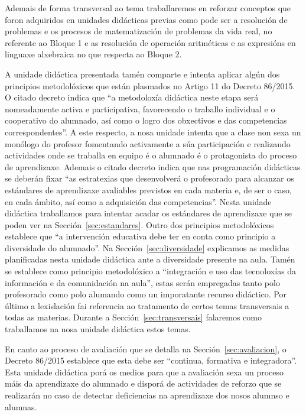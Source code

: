 Ademais de forma transversal ao tema traballaremos en reforzar conceptos que foron adquiridos en unidades didácticas previas como pode ser a resolución de problemas e os procesos de matematización de problemas da vida real, no referente ao Bloque 1 e as resolución de operación aritméticas e  as expresións en linguaxe alxebraica no que respecta ao Bloque 2.

A unidade didáctica presentada tamén comparte e intenta aplicar algún dos principios metodolóxicos que están plasmados no Artigo 11 do Decreto 86/2015. O citado decreto indica que ``a metodoloxía didáctica neste etapa será nomeadamente activa e participativa, favorecendo o traballo individual e o cooperativo do alumnado, así como o logro dos obxectivos e das competencias correspondentes''. A este respecto, a nosa unidade intenta que a clase non sexa un monólogo do profesor fomentando activamente a súa participación e realizando actividades onde se traballa en equipo é o alumnado é o protagonista do proceso de aprendizaxe. Ademais o citado decreto indica que nas programación didácticas se deberán fixar ``as estratexias que desenvolverá o profesorado para alcanzar os estándares de aprendizaxe avaliables previstos en cada materia e, de ser o caso, en cada ámbito, así como a adquisición das competencias''. Nesta unidade didáctica traballamos para intentar acadar os estándares de aprendizaxe que se poden ver na Sección~\ref{sec:estandares}. Outro dos principios metodolóxicos establece que ``a intervención educativa debe ter en conta como principio a diversidade do alumnado''. Na Sección~\ref{sec:diversidade} explicamos as medidas planificadas nesta unidade didáctica ante a diversidade presente na aula. Tamén se establece como principio metodolóxico a ``integración e uso das tecnoloxías da información e da comunidación na aula'', estas serán empregadas tanto polo profesorado como polo alumando como un imporatante recurso didáctico. Por último a lexislación fai referencia ao tratamento de certos temas transversais a todas as materias. Durante a Sección~\ref{sec:transversais} falaremos como traballamos na nosa unidade didáctica estos temas.

En canto ao proceso de avaliación que se detalla na Sección~\ref{sec:avaliacion}, o Decreto 86/2015 establece que esta debe ser ``continua, formativa e integradora''.  Esta unidade didáctica porá os medios para que a avaliación sexa un proceso máis da aprendizaxe do alumnado e disporá de actividades de reforzo que se realizarán no caso de detectar deficiencias na aprendizaxe dos nosos alumnso e alumnas.

